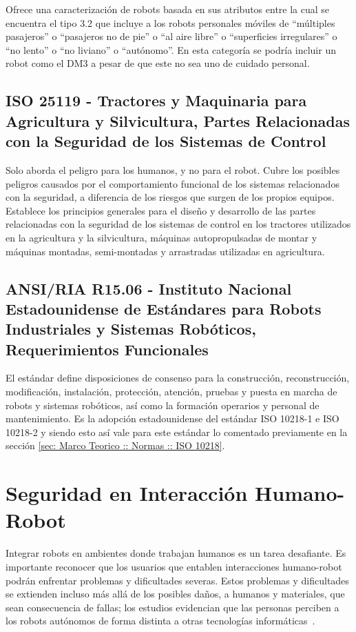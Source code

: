 \documentclass[withindex,glossary]{cam-thesis}
\begin{document}
Ofrece una caracterización de robots basada en sus atributos entre la cual se encuentra el tipo 3.2 que incluye a los robots personales móviles de ``múltiples pasajeros'' o ``pasajeros no de pie'' o ``al aire libre'' o ``superficies irregulares'' o ``no lento'' o ``no liviano'' o ``autónomo''. En esta categoría se podría incluir un robot como el DM3 a pesar de que este no sea uno de cuidado personal.


\subsection{ISO 25119 - Tractores y Maquinaria para Agricultura y Silvicultura, Partes Relacionadas con la Seguridad de los Sistemas de Control}
Solo aborda el peligro para los humanos, y no para el robot. Cubre los posibles peligros causados por el comportamiento funcional de los sistemas relacionados con la seguridad, a diferencia de los riesgos que surgen de los propios equipos. Establece los principios generales para el diseño y desarrollo de las partes relacionadas con la seguridad de los sistemas de control en los tractores utilizados en la agricultura y la silvicultura, máquinas autopropulsadas de montar y máquinas montadas, semi-montadas y arrastradas utilizadas en agricultura.

\subsection{ANSI/RIA R15.06 - Instituto Nacional Estadounidense de Estándares para Robots Industriales y Sistemas Robóticos, Requerimientos Funcionales}
El estándar define disposiciones de consenso para la construcción, reconstrucción, modificación, instalación, protección, atención, pruebas y puesta en marcha de robots y sistemas robóticos, así como la formación operarios y personal de mantenimiento. Es la adopción estadounidense del estándar ISO 10218-1 e ISO 10218-2 y siendo esto así vale para este estándar lo comentado previamente en la sección \ref{sec: Marco Teorico :: Normas :: ISO 10218}.

\section{Seguridad en Interacción Humano-Robot}
Integrar robots en ambientes donde trabajan humanos es un tarea desafiante. Es importante reconocer que los usuarios que entablen interacciones humano-robot podrán enfrentar problemas y dificultades severas. Estos problemas y dificultades se extienden incluso más allá de los posibles daños, a humanos y materiales, que sean consecuencia de fallas; los estudios evidencian que las personas perciben a los robots autónomos de forma distinta a otras tecnologías informáticas~\cite{kiesler2004introduction}.
\end{document}
